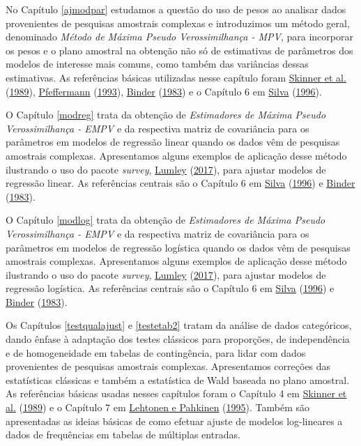 \documentclass[
  12pt,
  brazilian,
]{book}
\theoremstyle{definition}
\theoremstyle{definition}
\theoremstyle{definition}
\theoremstyle{definition}
\theoremstyle{remark}
\begin{document}
No Capítulo \ref{ajmodpar} estudamos a questão do uso de pesos ao analisar dados provenientes de pesquisas amostrais complexas e introduzimos um método geral, denominado \emph{Método de Máxima Pseudo Verossimilhança - MPV}, para incorporar os pesos e o plano amostral na obtenção não só de estimativas de parâmetros dos modelos de interesse mais comuns, como também das variâncias dessas estimativas. As referências básicas utilizadas nesse capítulo foram \protect\hyperlink{ref-SHS89}{Skinner et al.} (\protect\hyperlink{ref-SHS89}{1989}), \protect\hyperlink{ref-Pfeff}{Pfeffermann} (\protect\hyperlink{ref-Pfeff}{1993}), \protect\hyperlink{ref-binder83}{Binder} (\protect\hyperlink{ref-binder83}{1983}) e o Capítulo 6 em \protect\hyperlink{ref-Silva}{Silva} (\protect\hyperlink{ref-Silva}{1996}).

O Capítulo \ref{modreg} trata da obtenção de \emph{Estimadores de Máxima Pseudo Verossimilhança - EMPV} e da respectiva matriz de covariância para os parâmetros em modelos de regressão linear quando os dados vêm de pesquisas amostrais complexas. Apresentamos alguns exemplos de aplicação desse método ilustrando o uso do pacote \emph{survey}, \protect\hyperlink{ref-R-survey}{Lumley} (\protect\hyperlink{ref-R-survey}{2017}), para ajustar modelos de regressão linear. As referências centrais são o Capítulo 6 em \protect\hyperlink{ref-Silva}{Silva} (\protect\hyperlink{ref-Silva}{1996}) e \protect\hyperlink{ref-binder83}{Binder} (\protect\hyperlink{ref-binder83}{1983}).

O Capítulo \ref{modlog} trata da obtenção de \emph{Estimadores de Máxima Pseudo Verossimilhança - EMPV} e da respectiva matriz de covariância para os parâmetros em modelos de regressão logística quando os dados vêm de pesquisas amostrais complexas. Apresentamos alguns exemplos de aplicação desse método ilustrando o uso do pacote \emph{survey}, \protect\hyperlink{ref-R-survey}{Lumley} (\protect\hyperlink{ref-R-survey}{2017}), para ajustar modelos de regressão logística. As referências centrais são o Capítulo 6 em \protect\hyperlink{ref-Silva}{Silva} (\protect\hyperlink{ref-Silva}{1996}) e \protect\hyperlink{ref-binder83}{Binder} (\protect\hyperlink{ref-binder83}{1983}).

Os Capítulos \ref{testqualajust} e \ref{testetab2} tratam da análise de dados
categóricos, dando ênfase à adaptação dos testes clássicos para proporções, de independência e de homogeneidade em tabelas de contingência, para lidar com dados provenientes de pesquisas amostrais complexas. Apresentamos correções das estatísticas clássicas e também a estatística de Wald baseada no plano amostral. As referências básicas usadas nesses capítulos foram o Capítulo 4 em \protect\hyperlink{ref-SHS89}{Skinner et al.} (\protect\hyperlink{ref-SHS89}{1989}) e o Capítulo 7 em \protect\hyperlink{ref-lethonen}{Lehtonen e Pahkinen} (\protect\hyperlink{ref-lethonen}{1995}). Também são apresentadas as ideias básicas de como efetuar ajuste de modelos log-lineares a dados de frequências em tabelas de múltiplas entradas.
\end{document}
